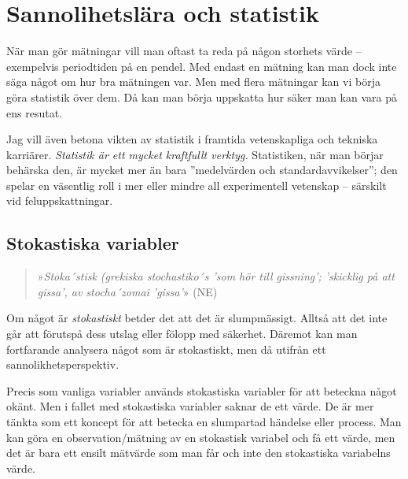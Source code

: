 \documentclass[11pt,a4paper, swedish
]{article}
\newcounter{exempel_counter}%
\begin{document}
%
\clearpage
\appendix






\section{Sannolihetslära och statistik}\label{sec:statistik}
När man gör mätningar vill man oftast ta reda på någon storhets värde
-- exempelvis periodtiden på en pendel. Med endast en mätning kan man
dock inte säga något om hur bra mätningen var. Men med flera mätningar
kan vi börja göra statistik över dem. Då kan man börja uppskatta hur
säker man kan vara på ens resutat.

Jag vill även betona vikten av statistik i framtida vetenskapliga och
tekniska karriärer. \emph{Statistik är ett mycket kraftfullt verktyg.}
Statistiken, när man börjar behärska den, är mycket mer än bara
''medelvärden och standardavvikelser''; den spelar en väsentlig roll i
mer eller mindre all experimentell vetenskap -- särskilt vid
feluppskattningar. 

\subsection{Stokastiska variabler}
\begin{quote}
»{\it Stoka\!´stisk (grekiska stochastiko\!´s 'som hör till gissning';
  'skicklig på att gissa', av stocha\!´zomai 'gissa'}» (NE)
\end{quote}
Om något är \emph{stokastiskt} betder det att det är
slumpmässigt. Alltså att det inte går att förutspå dess utslag eller
fölopp med säkerhet. Däremot kan man fortfarande analysera något som
är stokastiskt, men då utifrån ett sannolikhetsperspektiv. 

Precis som vanliga variabler används stokastiska variabler för att
beteckna något okänt. Men i fallet med stokastiska variabler saknar de
ett värde. De är mer tänkta som ett koncept för att betecka en
slumpartad händelse eller process. Man kan göra en observation/mätning
av en stokastisk variabel och få ett värde, men det är bara ett ensilt 
mätvärde som man får och inte den stokastiska variabelns värde. 
\end{document}
